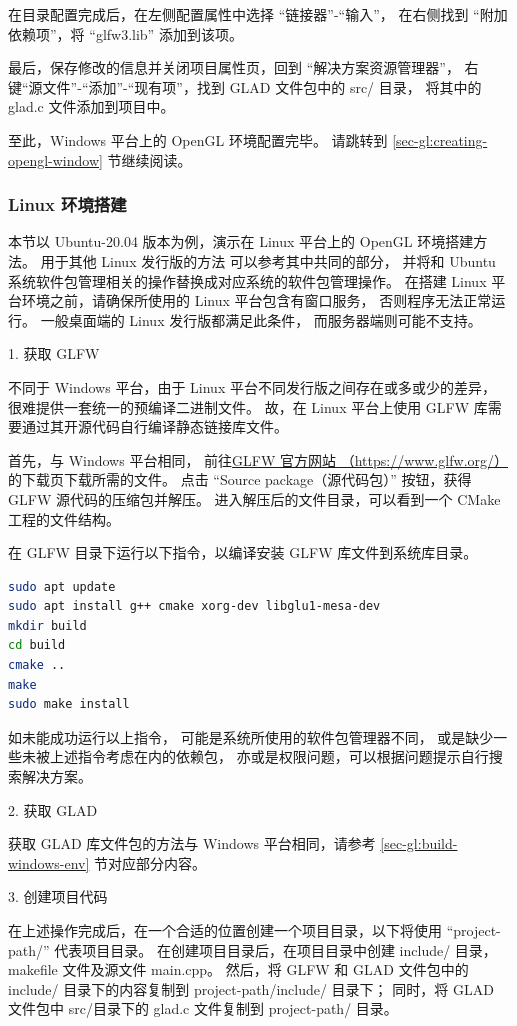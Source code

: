 \documentclass[fontset=windows]{ctexart}
\begin{document}
在目录配置完成后，在左侧配置属性中选择 “链接器”-“输入”，
在右侧找到 “附加依赖项”，将 “glfw3.lib” 添加到该项。

最后，保存修改的信息并关闭项目属性页，回到 “解决方案资源管理器”，
右键“源文件”-“添加”-“现有项”，找到 GLAD 文件包中的 src/ 目录，
将其中的 glad.c 文件添加到项目中。

至此，Windows 平台上的 OpenGL 环境配置完毕。
请跳转到 \ref{sec-gl:creating-opengl-window} 节继续阅读。

\subsubsection{Linux 环境搭建}

本节以 Ubuntu-20.04 版本为例，演示在 Linux 平台上的 OpenGL 环境搭建方法。
用于其他 Linux 发行版的方法
可以参考其中共同的部分，
并将和 Ubuntu 系统软件包管理相关的操作替换成对应系统的软件包管理操作。
在搭建 Linux 平台环境之前，请确保所使用的 Linux 平台包含有窗口服务，
否则程序无法正常运行。
一般桌面端的 Linux 发行版都满足此条件，
而服务器端则可能不支持。

1. 获取 GLFW

不同于 Windows 平台，由于 Linux 平台不同发行版之间存在或多或少的差异，
很难提供一套统一的预编译二进制文件。
故，在 Linux 平台上使用 GLFW 库需要通过其开源代码自行编译静态链接库文件。

首先，与 Windows 平台相同，
前往\href{https://www.glfw.org/}{GLFW 官方网站 （https://www.glfw.org/）}
的下载页下载所需的文件。
点击 “Source package（源代码包）” 按钮，获得 GLFW 源代码的压缩包并解压。
进入解压后的文件目录，可以看到一个 CMake 工程的文件结构。

在 GLFW 目录下运行以下指令，以编译安装 GLFW 库文件到系统库目录。

\begin{lstlisting}[language=bash]
sudo apt update
sudo apt install g++ cmake xorg-dev libglu1-mesa-dev
mkdir build
cd build
cmake ..
make
sudo make install
\end{lstlisting}

如未能成功运行以上指令，
可能是系统所使用的软件包管理器不同，
或是缺少一些未被上述指令考虑在内的依赖包，
亦或是权限问题，可以根据问题提示自行搜索解决方案。

2. 获取 GLAD

获取 GLAD 库文件包的方法与 Windows 平台相同，请参考 \ref{sec-gl:build-windows-env} 节对应部分内容。

3. 创建项目代码

在上述操作完成后，在一个合适的位置创建一个项目目录，以下将使用 “project-path/” 代表项目目录。
在创建项目目录后，在项目目录中创建 include/ 目录， makefile 文件及源文件 main.cpp。
然后，将 GLFW 和 GLAD 文件包中的 include/ 目录下的内容复制到 project-path/include/ 目录下；
同时，将 GLAD 文件包中 src/目录下的 glad.c 文件复制到 project-path/ 目录。
\end{document}
